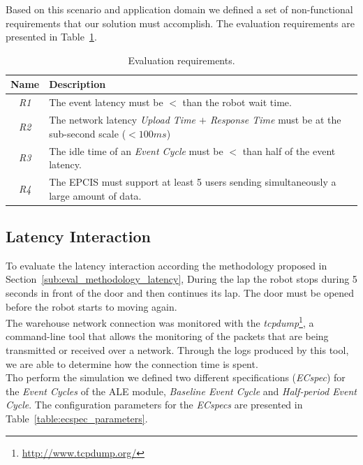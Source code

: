 Based on this scenario and application domain we defined a set of non-functional requirements that
our solution must accomplish. The evaluation requirements are presented in Table~\ref{table:eval_requirements}.

\begin{table}[ht!]
  \begin{tabular}{|c|l|}
    \hline
    Name          & Description                                                                                            \\ \hline
    \textit{R1}   & The event latency must be $<$ than the robot wait time.                                                \\ \hline
    \textit{R2}   & The network latency \textit{Upload Time $+$ Response Time} must be at the sub-second scale ($< 100ms$) \\ \hline
    \textit{R3}   & The idle time of an \textit{Event Cycle} must be $<$ than half of the event latency.                   \\ \hline
    \textit{R4}   & The EPCIS must support at least 5 users sending simultaneously a large amount of data.                 \\ \hline
  \end{tabular}
  \caption{Evaluation requirements.}
  \label{table:eval_requirements}
\end{table}

\subsection{Latency Interaction}
\label{sub:eval_exp_latency}
To evaluate the latency interaction according the methodology proposed in Section~\ref{sub:eval_methodology_latency},
During the lap the robot stops during 5 seconds in front of the door and then continues its lap.
The door must be opened before the robot starts to moving again.\\

The warehouse network connection was monitored with the \textit{tcpdump}\footnote{\url{http://www.tcpdump.org/}},
a command-line tool that allows the monitoring of the packets that are being transmitted or received
over a network. Through the logs produced by this tool, we are able to determine how the connection time
is spent.\\

Tho perform the simulation we defined two different specifications (\textit{ECspec}) for the
\textit{Event Cycles} of the \gls{ALE} module, \textit{Baseline Event Cycle} and
\textit{Half-period Event Cycle}. The configuration parameters for the \textit{ECspecs} are presented
in Table~\ref{table:ecspec_parameters}.

